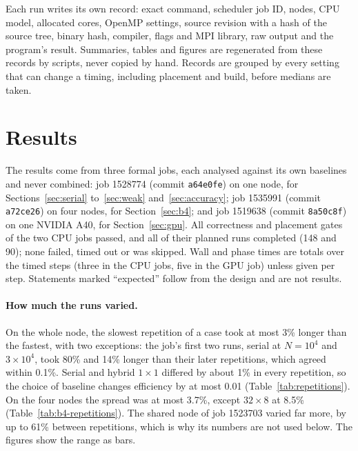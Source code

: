 \documentclass[10pt,a4paper,twocolumn,twoside]{rho-class/rho}
\newcommand{\pending}[1]{\textcolor{red}{\textbf{[PENDING: #1]}}}
\begin{document}
Each run writes its own record: exact command, scheduler job ID, nodes, CPU model, allocated cores, OpenMP settings, source revision with a hash of the source tree, binary hash, compiler, flags and MPI library, raw output and the program's result. Summaries, tables and figures are regenerated from these records by scripts, never copied by hand. Records are grouped by every setting that can change a timing, including placement and build, before medians are taken.

\section{Results}
\label{sec:results}
\newcommand{\resultslot}[2]{\IfFileExists{generated/#1.tex}{}{\pending{#2}}}
The results come from three formal jobs, each analysed against its own baselines and never combined: job 1528774 (commit \texttt{a64e0fe}) on one node, for Sections~\ref{sec:serial} to~\ref{sec:weak} and~\ref{sec:accuracy}; job 1535991 (commit \texttt{a72ce26}) on four nodes, for Section~\ref{sec:b4}; and job 1519638 (commit \texttt{8a50c8f}) on one NVIDIA A40, for Section~\ref{sec:gpu}. All correctness and placement gates of the two CPU jobs passed, and all of their planned runs completed (148 and 90); none failed, timed out or was skipped. Wall and phase times are totals over the timed steps (three in the CPU jobs, five in the GPU job) unless given per step. Statements marked ``expected'' follow from the design and are not results.

\paragraph{How much the runs varied.} On the whole node, the slowest repetition of a case took at most 3\% longer than the fastest, with two exceptions: the job's first two runs, serial at $N=10^4$ and $3\times10^4$, took 80\% and 14\% longer than their later repetitions, which agreed within 0.1\%. Serial and hybrid $1\times1$ differed by about 1\% in every repetition, so the choice of baseline changes efficiency by at most 0.01 (Table~\ref{tab:repetitions}). On the four nodes the spread was at most 3.7\%, except $32\times8$ at 8.5\% (Table~\ref{tab:b4-repetitions}). The shared node of job 1523703 varied far more, by up to 61\% between repetitions, which is why its numbers are not used below. The figures show the range as bars.
\end{document}
